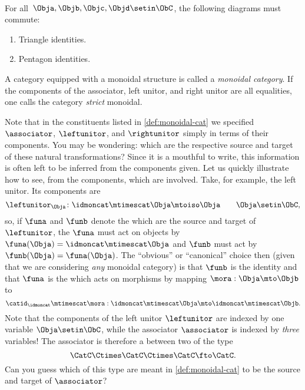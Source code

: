 \begin{ctdefinition}
    \condit\\
    For all~$\Obja,\Objb,\Objc,\Objd\setin \ObC$, the following diagrams must commute:
    \begin{enumerate}
        \item Triangle identities.
        \item Pentagon identities.\\
    \end{enumerate}
    A category equipped with a monoidal structure is called a \emph{monoidal category}.
    If the components of the associator, left unitor, and right unitor are all equalities, one calls the category \emph{strict} monoidal.
\end{ctdefinition}

\begin{remark}
    Note that in the constituents listed in \cref{def:monoidal-cat} we specified  $\associator$, $\leftunitor$, and $\rightunitor$ simply in terms of their components.
    You may be wondering: which  are the respective source and target of these natural transformations?
    Since it is a mouthful to write, this information is often left to be inferred from the components given.
    Let us quickly illustrate how to see, from the components, which  are involved.
    Take, for example, the left unitor.
    Its components are
    \begin{equation}
        \leftunitor_\Obja \colon \idmoncat\mtimescat \Obja \mtoiso \Obja \quad \quad \Obja\setin \ObC,
    \end{equation}
    so, if $\funa$ and $\funb$ denote the  which are the source and target of $\leftunitor$, the  $\funa$ must act on objects by $\funa(\Obja) = \idmoncat \mtimescat \Obja$ and $\funb$ must act by $\funb(\Obja) = \funa(\Obja)$.
    The ``obvious'' or ``canonical'' choice then (given that we are considering \emph{any} monoidal category) is that $\funb$ is the identity  and that $\funa$ is the  which acts on morphisms by mapping $\mora : \Obja \mto \Objb$ to
    \begin{equation}
        \catid_\idmoncat \mtimescat \mora:   \idmoncat\mtimescat \Obja \mto  \idmoncat\mtimescat \Objb.
    \end{equation}
    Note that the components of the left unitor $\leftunitor$ are indexed by one variable $\Obja \setin \ObC$, while the associator $\associator$ is indexed by \emph{three} variables!
    The associator is therefore a  between two  of the type
    \begin{equation}
        \CatC \Ctimes \CatC \Ctimes \CatC \fto \CatC.
    \end{equation}
    Can you guess which  of this type are meant in \cref{def:monoidal-cat} to be the source and target of $\associator$?
\end{remark}

